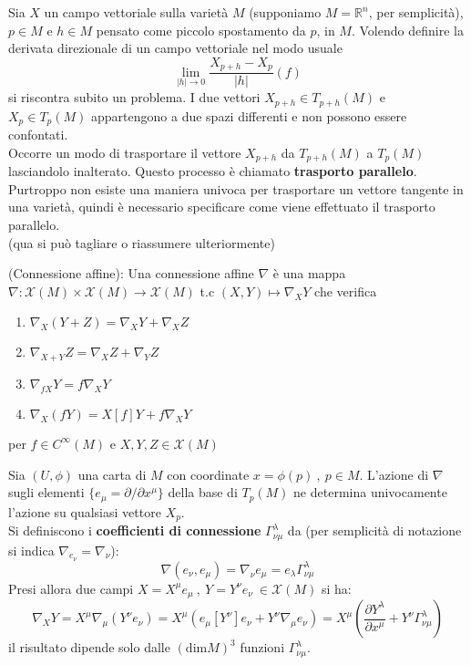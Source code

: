 Sia $X$ un campo vettoriale sulla varietà $M$ (supponiamo $M = \mathbb{R}^n$,
per semplicità), $p \in M$ e $h \in M$ pensato come piccolo spostamento da $p$, in $M$.
Volendo definire la derivata direzionale di un campo vettoriale nel modo usuale
$$
   \lim_{|h| \to 0} \frac{X_{p+h}-X_p}{|h|}(f)
$$
si riscontra subito un problema. I due vettori $X_{p+h} \in T_{p+h}(M)$ e
$X_p \in T_p(M)$ appartengono a due spazi differenti e non possono essere confontati.\\
Occorre un modo di trasportare il vettore $X_{p+h}$ da $T_{p+h}(M)$ a $T_p(M)$
lasciandolo inalterato. Questo processo è chiamato \textbf{trasporto parallelo}.
Purtroppo non esiste una maniera univoca per trasportare un vettore tangente in
una varietà, quindi è necessario specificare come viene effettuato il trasporto
parallelo.\\

(qua si può tagliare o riassumere ulteriormente)
\begin{definition}{(Connessione affine):}\label{def:affineconnection}
   Una connessione affine $\nabla$ è una mappa $\nabla : \mathcal{X}(M) \times
   \mathcal{X}(M)\to \mathcal{X}(M)$ t.c $(X,Y) \mapsto \nabla_X Y$ che verifica
   \begin{enumerate}
      \item $ \nabla_X (Y+Z) = \nabla_X Y + \nabla_X Z $
      \item $ \nabla_{X+Y} Z = \nabla_X Z + \nabla_Y Z $
      \item $ \nabla_{fX} Y = f\nabla_X Y $
      \item $ \nabla_X (fY) = X[f] Y + f\nabla_X Y $
   \end{enumerate}
   per $f \in C^\infty(M)$ e $X,Y,Z \in \mathcal{X}(M)$
\end{definition}

Sia $(U,\phi)$ una carta di $M$ con coordinate $x = \phi(p) \:,\: p\in M$.
L'azione di $\nabla$ sugli elementi $\{ e_\mu = \partial/ \partial x^\mu \}$
della base di $T_p(M)$ ne determina univocamente l'azione su qualsiasi vettore $X_p$.\\

Si definiscono i \textbf{coefficienti di connessione} $\Gamma^\lambda_{\nu\mu}$ da
(per semplicità di notazione si indica $\nabla_{e_\nu} = \nabla_\nu$):
$$
   \nabla (e_\nu,e_\mu) = \nabla_\nu e_\mu =
      e_\lambda \Gamma^\lambda_{\nu\mu}
$$
Presi allora due campi $X = X^\mu e_\mu \: , \: Y = Y^\nu e_\nu \:
\in \mathcal{X}(M)$ si ha:
$$
   \nabla_X Y
      = X^\mu \nabla_\mu(Y^\nu e_\nu)
      = X^\mu(e_\mu[Y^\nu]e_\nu + Y^\nu \nabla_\mu e_\nu)
      = X^\mu \left(\frac{\partial Y^\lambda }{\partial x^\mu}
         + Y^\nu \Gamma^\lambda_{\nu\mu} \right)
$$
il risultato dipende solo dalle $(\mathrm{dim} M)^3$ funzioni $\Gamma^\lambda_{\nu\mu}$.\\

